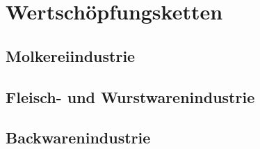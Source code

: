 \section{Wertschöpfungsketten}

\subsection{Molkereiindustrie}

\subsection{Fleisch- und Wurstwarenindustrie}

\subsection{Backwarenindustrie}


